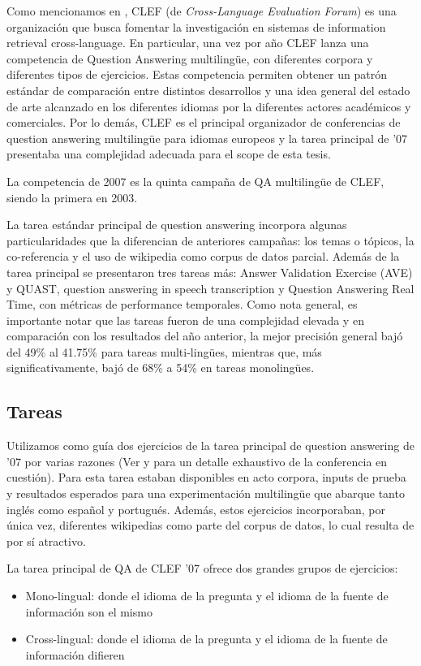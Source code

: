 Como mencionamos en , CLEF (de \textit{Cross-Language Evaluation Forum}) es una organización que busca fomentar la investigación en sistemas de information retrieval cross-language. En particular, una vez por año CLEF lanza una competencia de Question Answering multilingüe, con diferentes corpora y diferentes tipos de ejercicios. Estas competencia permiten obtener un patrón estándar de comparación entre distintos desarrollos y una idea general del estado de arte alcanzado en los diferentes idiomas por la diferentes actores académicos y comerciales. Por lo demás, CLEF es el principal organizador de conferencias de question answering multilingüe para idiomas europeos y la tarea principal de '07 presentaba una complejidad adecuada para el scope de esta tesis.

La competencia de 2007 es la quinta campaña de QA multilingüe de CLEF, siendo la primera en 2003.

La tarea estándar principal de question answering incorpora algunas particularidades que la diferencian de anteriores campañas: los temas o tópicos, la co-referencia y el uso de wikipedia como corpus de datos parcial. Además de la tarea principal se presentaron tres tareas más: Answer Validation Exercise (AVE) y QUAST, question answering in speech transcription y Question Answering Real Time, con métricas de performance temporales. Como nota general, es importante notar que las tareas fueron de una complejidad elevada y en comparación con los resultados del año anterior, la mejor precisión general bajó del 49\% al 41.75\% para tareas multi-lingües, mientras que, más significativamente, bajó de 68\% a 54\% en tareas monolingües.


\subsection{Tareas}
\label{subsec:tareas}
Utilizamos como guía dos ejercicios de la tarea principal de question answering de '07  por varias razones (Ver \cite{GuidelineClef07} y \cite{OverviewClef07} para un detalle exhaustivo de la conferencia en cuestión). Para esta tarea estaban disponibles en acto corpora, inputs de prueba y resultados esperados para una experimentación multilingüe que abarque tanto inglés como español y portugués. Además, estos ejercicios incorporaban, por única vez, diferentes wikipedias como parte del corpus de datos, lo cual resulta de por sí atractivo.

La tarea principal de QA de CLEF '07 ofrece dos grandes grupos de ejercicios:
\begin{itemize}
\item Mono-lingual: donde el idioma de la pregunta y el idioma de la fuente de información son el mismo
\item Cross-lingual: donde el idioma de la pregunta y el idioma de la fuente de información difieren
\end{itemize}

